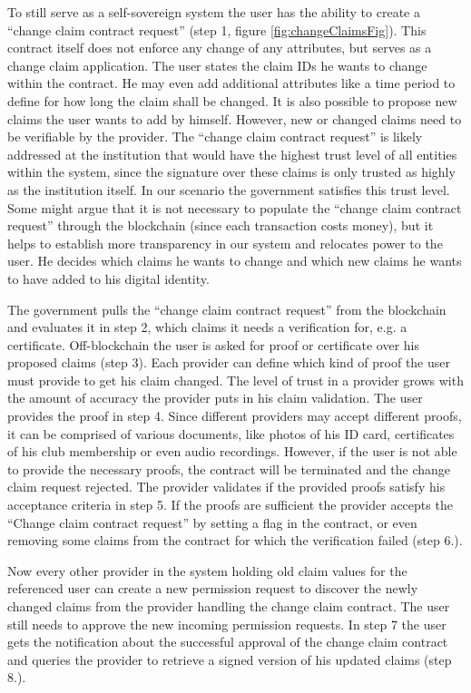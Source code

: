 To still serve as a self-sovereign system the user has the ability to create a “change claim contract request” (step 1, figure \ref{fig:changeClaimsFig}). This contract itself does not enforce any change of any attributes, but serves as a change claim application. The user states the claim IDs he wants to change within the contract. He may even add additional attributes like a time period to define for how long the claim shall be changed. It is also possible to propose new claims the user wants to add by himself. However, new or changed claims need to be verifiable by the provider. The “change claim contract request” is likely addressed at the institution that would have the highest trust level of all entities within the system, since the signature over these claims is only trusted as highly as the institution itself. In our scenario the government satisfies this trust level. Some might argue that it is not necessary to populate the “change claim contract request” through the blockchain (since each transaction costs money), but it helps to establish more transparency in our system and relocates power to the user. He decides which claims he wants to change and which new claims he wants to have added to his digital identity.

The government pulls the “change claim contract request” from the blockchain and evaluates it in step 2, which claims it needs a verification for, e.g. a certificate. Off-blockchain the user is asked for proof or certificate over his proposed claims (step 3). Each provider can define which kind of proof the user must provide to get his claim changed. The level of trust in a provider grows with the amount of accuracy the provider puts in his claim validation. The user provides the proof in step 4. Since different providers may accept different proofs, it can be comprised of various documents, like photos of his ID card, certificates of his club membership or even audio recordings. However, if the user is not able to provide the necessary proofs, the contract will be terminated and the change claim request rejected.
The provider validates if the provided proofs satisfy his acceptance criteria in step 5.  If the proofs are sufficient the provider accepts the “Change claim contract request” by setting a flag in the contract, or even removing some claims from the contract for which the verification failed (step 6.).

Now every other provider in the system holding old claim values for the referenced user can create a new permission request to discover the newly changed claims from the provider handling the change claim contract. The user still needs to approve the new incoming permission requests. In step 7 the user gets the notification about the successful approval of the change claim contract and queries the provider to retrieve a signed version of his updated claims (step 8.).

